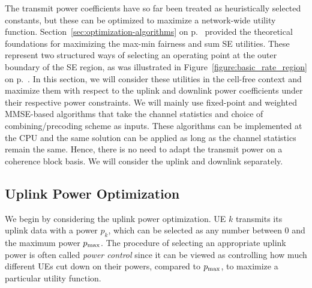 The transmit power coefficients have so far been treated as heuristically selected constants, but these can be optimized to maximize a network-wide utility function. Section~\ref{sec:optimization-algorithms} on p.~\pageref{sec:optimization-algorithms} provided the theoretical foundations for maximizing the max-min fairness and sum SE utilities. 
These represent two structured ways of selecting an operating point at the outer boundary of the SE region, as was illustrated in Figure~\ref{figure:basic_rate_region} on p.~\pageref{figure:basic_rate_region}.
In this section, we will consider these utilities in the cell-free context and maximize them with respect to the uplink and downlink power coefficients under their respective power constraints. We will mainly use fixed-point and weighted MMSE-based algorithms that take the channel statistics and choice of combining/precoding scheme as inputs. These algorithms can be implemented at the CPU and the same solution can be applied as long as the channel statistics remain the same. Hence, there is no need to adapt the transmit power on a  coherence block basis.
We will consider the uplink and downlink separately.

\subsection{Uplink Power Optimization}
\label{sec:optimized-power-allocation-uplink}

We begin by considering the uplink power optimization.
UE $k$ transmits its uplink data with a power $p_k$, which can be selected as any number between $0$ and the maximum  power $p_{\textrm{max}}$. The procedure of selecting an appropriate uplink power is often called \emph{power control} since it can be viewed as controlling how much different UEs cut down on their powers, compared to $p_{\textrm{max}}$, to maximize a particular utility function.

\enlargethispage{0.75\baselineskip} 

